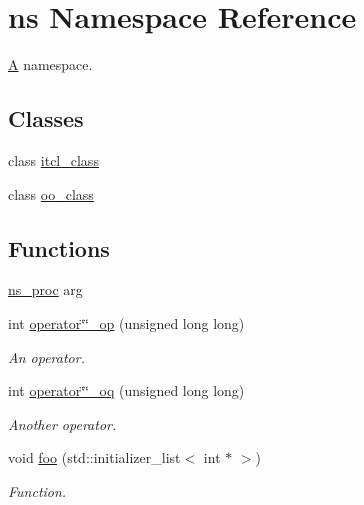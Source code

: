 \hypertarget{namespacens}{}\section{ns Namespace Reference}
\label{namespacens}


\mbox{\hyperlink{class_a}{A}} namespace.  


\subsection*{Classes}
\begin{DoxyCompactItemize}
\item 
class \mbox{\hyperlink{classns_1_1itcl__class}{itcl\+\_\+class}}
\item 
class \mbox{\hyperlink{classns_1_1oo__class}{oo\+\_\+class}}
\end{DoxyCompactItemize}
\subsection*{Functions}
\begin{DoxyCompactItemize}
\item 
\mbox{\hyperlink{namespacens_a1429cbe84d32b17ea4783e5c5c00615b}{ns\+\_\+proc}} arg
\item 
\mbox{\label{namespacens_afd2e8a8437eff630f52a452ea6dc6e82}} 
int \mbox{\hyperlink{namespacens_afd2e8a8437eff630f52a452ea6dc6e82}{operator\char`\"{}\char`\"{}\+\_\+op}} (unsigned long long)
\begin{DoxyCompactList}\small\item\em An operator. \end{DoxyCompactList}\item 
\mbox{\label{namespacens_a47f70e51e66b81b8383a4e2da66f1e09}} 
int \mbox{\hyperlink{namespacens_a47f70e51e66b81b8383a4e2da66f1e09}{operator\char`\"{}\char`\"{}\+\_\+oq}} (unsigned long long)
\begin{DoxyCompactList}\small\item\em Another operator. \end{DoxyCompactList}\item 
\mbox{\label{namespacens_aaa9eb8a7b40d4ed0edbe5e163b4e6e8d}} 
void \mbox{\hyperlink{namespacens_aaa9eb8a7b40d4ed0edbe5e163b4e6e8d}{foo}} (std\+::initializer\+\_\+list$<$ int $\ast$ $>$)
\begin{DoxyCompactList}\small\item\em Function. \end{DoxyCompactList}\end{DoxyCompactItemize}



